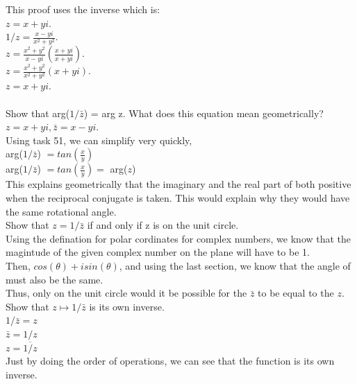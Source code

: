 \documentclass[12pt]{article}
\begin{document}
This proof uses the inverse which is: \\
$z = x + yi$.\\
$1/z = \frac{x-yi}{x^2+y^2}$.\\
$z = \frac{x^2+y^2}{x-yi} (\frac{x+yi}{x+yi})$.\\
$z = \frac{x^2+y^2}{x^2+y^2} (x+yi) $.\\
$z = x+yi$.\\

\\


 Show that arg($1/\bar{z}$) = arg z. What does this equation mean geometrically?\\
$z = x + yi, \bar{z} = x - yi$.\\
Using task 51, we can simplify very quickly,\\

arg($1/\bar{z}$) $= tan(\frac{x}{y})$\\
arg($1/\bar{z}$) $= tan(\frac{x}{y}) =$ arg($z$) \\

This explains geometrically that the imaginary and the real part of both positive when the reciprocal conjugate is taken. 
This would explain why they would have the same rotational angle.\\

 Show that $z = 1/\bar{z}$ if and only if z is on the unit circle.\\

Using the defination for polar cordinates for complex numbers, we know that the magintude of the given complex number on the plane will have to be 1.\\
Then, $cos(\theta) + isin(\theta)$, and using the last section, we know that the angle of must also be the same.\\

Thus, only on the unit circle would it be possible for the $\bar{z}$ to be equal to the $z$.\\ 

 Show that $z \mapsto 1/\bar{z}$ is its own inverse.\\

$1/\bar{z} = z$\\
$\bar{z} = 1/z$\\
$z = \overline{1/z}$\\

Just by doing the order of operations, we can see that the function is its own inverse.\\
\end{document}
